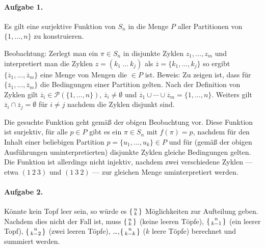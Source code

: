 \documentclass{article}
\begin{document}
\paragraph{Aufgabe 1.}

Es gilt eine surjektive Funktion von $S_n$ in die Menge $P$ aller Partitionen von $\{1, \ldots, n\}$ zu konstruieren.

Beobachtung: Zerlegt man ein $\pi \in S_n$ in disjunkte Zyklen $z_1, \ldots, z_m$ und interpretiert man die Zyklen $z = (k_1\ \ldots\ k_j)$ als $\overline{z} = \{ k_1, \ldots, k_j \}$ so ergibt $\{ \overline{z}_1, \ldots, \overline{z}_m \}$ eine Menge von Mengen die $\in P$ ist. Beweis: Zu zeigen ist, dass f\"ur $\{ \overline{z}_1, \ldots, \overline{z}_m \}$ die Bedingungen einer Partition gelten. Nach der Definition von Zyklen gilt $\overline{z}_i \in \mathcal{P}(\{1, \ldots, n\})$, $\overline{z}_i \neq \emptyset$ und $\overline{z}_1 \cup \cdots \cup \overline{z}_m = \{ 1, \ldots, n \}$. Weiters gilt $\overline{z}_i \cap \overline{z}_j = \emptyset$ f\"ur $i \neq j$ nachdem die Zyklen disjunkt sind.

Die gesuchte Funktion geht gem\"aß der obigen Beobachtung vor. Diese Funktion ist surjektiv, f\"ur alle $p \in P$ gibt es ein $\pi \in S_n$ mit $f(\pi) = p$, nachdem f\"ur den Inhalt einer beliebigen Partition $p = \{ u_1, \ldots, u_k \} \in P$ und f\"ur (gem\"aß der obigen Ausf\"uhrungen uminterpretierten) disjunkte Zyklen gleiche Bedingungen gelten. Die Funktion ist allerdings nicht injektiv, nachdem zwei verschiedene Zyklen --- etwa $(1\ 2\ 3)$ und $(1\ 3\ 2)$ --- zur gleichen Menge uminterpretiert werden.

\paragraph{Aufgabe 2.}

K\"onnte kein Topf leer sein, so w\"urde es $\begin{Bsmallmatrix}n \\k\end{Bsmallmatrix}$ M\"oglichkeiten zur Aufteilung geben. Nachdem dies nicht der Fall ist, muss $\begin{Bsmallmatrix}n \\k\end{Bsmallmatrix}$ (keine leeren T\"opfe), $\begin{Bsmallmatrix}n \\k - 1\end{Bsmallmatrix}$ (ein leerer Topf), $\begin{Bsmallmatrix}n \\k - 2\end{Bsmallmatrix}$ (zwei leeren T\"opfe), \ldots ,$\begin{Bsmallmatrix}n \\k - k\end{Bsmallmatrix}$ ($k$ leere T\"opfe) berechnet und summiert werden.
\end{document}
